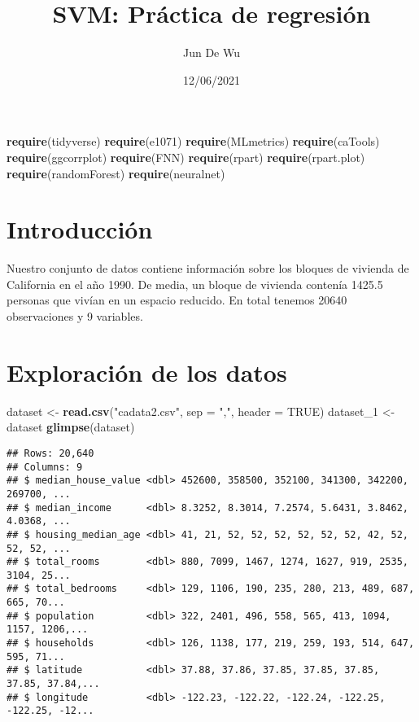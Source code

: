 \documentclass[
]{article}
\title{SVM: Práctica de regresión}
\author{Jun De Wu}
\date{12/06/2021}
\newenvironment{Shaded}{\begin{snugshade}}{\end{snugshade}}
\newcommand{\DataTypeTok}[1]{\textcolor[rgb]{0.13,0.29,0.53}{#1}}
\newcommand{\DecValTok}[1]{\textcolor[rgb]{0.00,0.00,0.81}{#1}}
\newcommand{\KeywordTok}[1]{\textcolor[rgb]{0.13,0.29,0.53}{\textbf{#1}}}
\newcommand{\NormalTok}[1]{#1}
\newcommand{\OtherTok}[1]{\textcolor[rgb]{0.56,0.35,0.01}{#1}}
\newcommand{\StringTok}[1]{\textcolor[rgb]{0.31,0.60,0.02}{#1}}
\begin{document}
\maketitle

{
\hypersetup{linkcolor=blue}
\setcounter{tocdepth}{2}
\tableofcontents
}
\begin{Shaded}
\begin{Highlighting}[]
\KeywordTok{require}\NormalTok{(tidyverse)}
\KeywordTok{require}\NormalTok{(e1071)}
\KeywordTok{require}\NormalTok{(MLmetrics)}
\KeywordTok{require}\NormalTok{(caTools)}
\KeywordTok{require}\NormalTok{(ggcorrplot)}
\KeywordTok{require}\NormalTok{(FNN)}
\KeywordTok{require}\NormalTok{(rpart)}
\KeywordTok{require}\NormalTok{(rpart.plot)}
\KeywordTok{require}\NormalTok{(randomForest)}
\KeywordTok{require}\NormalTok{(neuralnet)}
\end{Highlighting}
\end{Shaded}

\hypertarget{introducciuxf3n}{%
\section{Introducción}\label{introducciuxf3n}}

Nuestro conjunto de datos contiene información sobre los bloques de
vivienda de California en el año 1990. De media, un bloque de vivienda
contenía 1425.5 personas que vivían en un espacio reducido. En total
tenemos 20640 observaciones y 9 variables.

\hypertarget{exploraciuxf3n-de-los-datos}{%
\section{Exploración de los datos}\label{exploraciuxf3n-de-los-datos}}

\begin{Shaded}
\begin{Highlighting}[]
\NormalTok{dataset <-}\StringTok{ }\KeywordTok{read.csv}\NormalTok{(}\StringTok{"cadata2.csv"}\NormalTok{, }\DataTypeTok{sep =} \StringTok{","}\NormalTok{, }\DataTypeTok{header =} \OtherTok{TRUE}\NormalTok{)}
\NormalTok{dataset_}\DecValTok{1}\NormalTok{ <-}\StringTok{ }\NormalTok{dataset}
\KeywordTok{glimpse}\NormalTok{(dataset)}
\end{Highlighting}
\end{Shaded}

\begin{verbatim}
## Rows: 20,640
## Columns: 9
## $ median_house_value <dbl> 452600, 358500, 352100, 341300, 342200, 269700, ...
## $ median_income      <dbl> 8.3252, 8.3014, 7.2574, 5.6431, 3.8462, 4.0368, ...
## $ housing_median_age <dbl> 41, 21, 52, 52, 52, 52, 52, 52, 42, 52, 52, 52, ...
## $ total_rooms        <dbl> 880, 7099, 1467, 1274, 1627, 919, 2535, 3104, 25...
## $ total_bedrooms     <dbl> 129, 1106, 190, 235, 280, 213, 489, 687, 665, 70...
## $ population         <dbl> 322, 2401, 496, 558, 565, 413, 1094, 1157, 1206,...
## $ households         <dbl> 126, 1138, 177, 219, 259, 193, 514, 647, 595, 71...
## $ latitude           <dbl> 37.88, 37.86, 37.85, 37.85, 37.85, 37.85, 37.84,...
## $ longitude          <dbl> -122.23, -122.22, -122.24, -122.25, -122.25, -12...
\end{verbatim}
\end{document}
